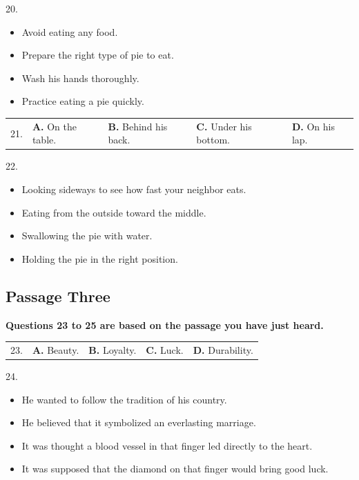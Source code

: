 \documentclass[UTF8,11pt]{ctexart}
\begin{document}
20.


\begin{itemize}[leftmargin=2em,itemsep=.2em,topsep=.4em]\item[A.] Avoid eating any food.
\item[B.] Prepare the right type of pie to eat.
\item[C.] Wash his hands thoroughly.
\item[D.] Practice eating a pie quickly.
\end{itemize}

\noindent\begin{tabularx}{\linewidth}{@{}lXXXX@{}}21. & \textbf{A.} On the table. & \textbf{B.} Behind his back. & \textbf{C.} Under his bottom. & \textbf{D.} On his lap.\\\end{tabularx}\par

22.


\begin{itemize}[leftmargin=2em,itemsep=.2em,topsep=.4em]\item[A.] Looking sideways to see how fast your neighbor eats.
\item[B.] Eating from the outside toward the middle.
\item[C.] Swallowing the pie with water.
\item[D.] Holding the pie in the right position.
\end{itemize}

\subsection*{\textbf{Passage Three}}


\textbf{Questions 23 to 25 are based on the passage you have just heard.}


\noindent\begin{tabularx}{\linewidth}{@{}lXXXX@{}}23. & \textbf{A.} Beauty. & \textbf{B.} Loyalty. & \textbf{C.} Luck. & \textbf{D.} Durability.\\\end{tabularx}\par

24.


\begin{itemize}[leftmargin=2em,itemsep=.2em,topsep=.4em]\item[A.] He wanted to follow the tradition of his country.
\item[B.] He believed that it symbolized an everlasting marriage.
\item[C.] It was thought a blood vessel in that finger led directly to the heart.
\item[D.] It was supposed that the diamond on that finger would bring good luck.
\end{itemize}
\end{document}
